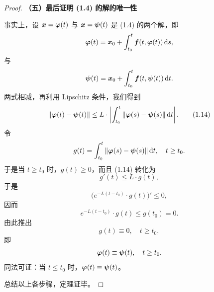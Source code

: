 \begin{proof}
	\textbf{（五）最后证明 (1.4) 的解的唯一性}

	事实上，设 $\boldsymbol{x} = \boldsymbol{\varphi}(t)$ 与 $\boldsymbol{x} = \boldsymbol{\psi}(t)$ 是 (1.4) 的两个解，即
	\[
		\boldsymbol{\varphi}(t) = \boldsymbol{x}_0 + \int_{t_0}^t \boldsymbol{f}(t,\boldsymbol{\varphi}(t))\,\mathrm{d} s,
	\]
	与
	\[
		\boldsymbol{\psi}(t) = \boldsymbol{x}_0 + \int_{t_0}^t \boldsymbol{f}(t,\boldsymbol{\psi}(t))\,\mathrm{d} t.
	\]
	两式相减，再利用 Lipschitz 条件，我们得到
	\[
		\|\boldsymbol{\varphi}(t) - \boldsymbol{\psi}(t)\| 
		\leq L \cdot \left|\int_{t_0}^t \|\boldsymbol{\varphi}(s) - \boldsymbol{\psi}(s)\|\,\mathrm{d} t\right|.
		\tag{1.14}
	\]
	令
	\[
		g(t) = \int_{t_0}^t \|\boldsymbol{\varphi}(s) - \boldsymbol{\psi}(s)\|\,\mathrm{d} t, \quad t \geq t_0.
	\]
	于是当 $t \geq t_0$ 时，$g(t) \geq 0$，而且 (1.14) 转化为
	\[
		g'(t) \leq L \cdot g(t),
		\tag{1.15}
	\]
	于是
	\[
		\bigl(e^{-L(t - t_0)} \cdot g(t)\bigr)' \leq 0,
	\]
	因而
	\[
		e^{-L(t - t_0)} \cdot g(t) \leq g(t_0) = 0.
	\]
	由此推出
	\[
		g(t) \equiv 0, \quad t \geq t_0,
	\]
	即
	\[
		\boldsymbol{\varphi}(t) \equiv \boldsymbol{\psi}(t), \quad t \geq t_0.
	\]
	同法可证：当 $t \leq t_0$ 时，$\boldsymbol{\varphi}(t) \equiv \boldsymbol{\psi}(t)$。

	总结以上各步骤，定理证毕。
\end{proof}

